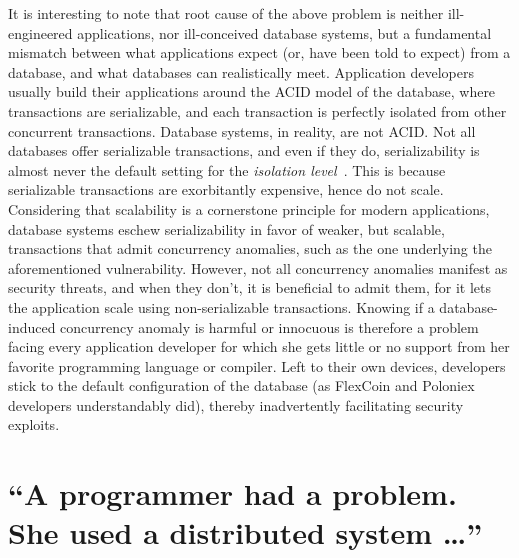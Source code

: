 It is interesting to note that root cause of the above problem is
neither ill-engineered applications, nor ill-conceived database
systems, but a fundamental mismatch between what applications expect
(or, have been told to expect) from a database, and what databases can
realistically meet.  Application developers usually build their
applications around the ACID model of the database, where transactions
are serializable, and each transaction is perfectly isolated from
other concurrent transactions. Database systems, in reality, are not
ACID. Not all databases offer serializable transactions, and even if
they do, serializability is almost never the default setting for the
\emph{isolation level}~\cite{bailishotos, bailisblog}. This is because
serializable transactions are exorbitantly expensive, hence do not
scale.  Considering that scalability is a cornerstone principle for
modern applications, database systems eschew serializability in favor
of weaker, but scalable, transactions that admit concurrency
anomalies, such as the one underlying the aforementioned
vulnerability. However, not all concurrency anomalies manifest as
security threats, and when they don't, it is beneficial to admit them,
for it lets the application scale using non-serializable transactions.
Knowing if a database-induced concurrency anomaly is harmful or
innocuous is therefore a problem facing every application developer
for which she gets little or no support from her favorite programming
language or compiler. Left to their own devices, developers stick to
the default configuration of the database (as FlexCoin and Poloniex
developers understandably did), thereby inadvertently facilitating
security exploits. 

\section*{``A programmer had a problem. She used a distributed system \ldots''}

